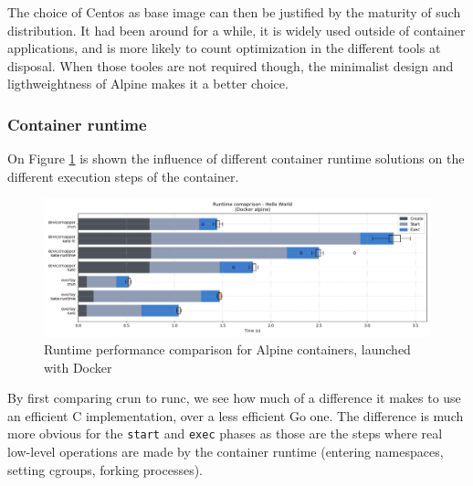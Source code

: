 The choice of Centos as base image can then be justified by the maturity of such distribution.  It had been around for a while, it is widely used outside of container applications, and is more likely to count optimization in the different tools at disposal.  When those tooles are not required though, the minimalist design and ligthweightness of Alpine makes it a better choice.

\subsubsection{Container runtime}

On Figure \ref{fig:q1:runtime} is shown the influence of different container runtime solutions on the different execution steps of the container.  

\begin{figure}[h!]
  \begin{center}
    \includegraphics[width=\linewidth]{images/question-1-runtime.png}
    \caption{Runtime performance comparison for Alpine containers, launched with Docker}
    \label{fig:q1:runtime}
  \end{center}
\end{figure}

By first comparing crun to runc, we see how much of a difference it makes to use an efficient C implementation, over a less efficient Go one.  The difference is much more obvious for the \texttt{start} and \texttt{exec} phases as those are the steps where real low-level operations are made by the container runtime (entering namespaces, setting cgroups, forking processes).  

